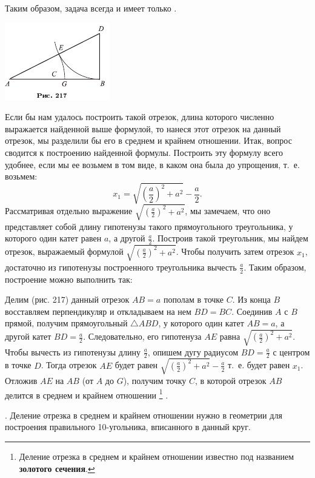 \documentclass[oneside]{book}
\begin{document}
Таким образом, задача всегда  и имеет только . %

\includegraphics{pics/ris-217}

Если бы нам удалось построить такой отрезок, длина которого численно выражается найденной выше формулой, то нанеся этот отрезок на данный отрезок, мы разделили бы его в среднем и крайнем отношении.
Итак, вопрос сводится к построению найденной формулы.
Построить эту формулу всего удобнее, если мы ее возьмем в том виде, в каком она была до упрощения, т.~е. возьмем:
\[x_1= \sqrt{\left(\frac a2\right)^2+a^2}-\frac a2.\]
Рассматривая отдельно выражение $\sqrt{\left(\frac a2\right)^2+a^2}$, мы замечаем, что оно представляет собой длину гипотенузы такого прямоугольного треугольника, у которого один катет равен $a$, а другой $\frac a2$.
Построив такой треугольник, мы найдем отрезок, выражаемый формулой $\sqrt{\left(\frac a2\right)^2+a^2}$.
Чтобы получить затем отрезок $x_1$, достаточно из гипотенузы построенного треугольника вычесть $\frac a2$.
Таким образом, построение можно выполнить так:

Делим (рис. 217) данный отрезок $AB=a$ пополам в точке $C$.
Из конца $B$ восставляем перпендикуляр и откладываем на нем $BD = BC$.
Соединив $A$ с $B$ прямой, получим прямоугольный $\triangle ABD$, у которого один катет $AB=a$, а другой катет $BD=\frac a2$.
Следовательно, его гипотенуза $AE$ равна $\sqrt{\left(\frac a2\right)^2+a^2}$.
Чтобы вычесть из гипотенузы длину $\frac a2$, опишем дугу радиусом $BD=\frac a2$ с центром в точке $D$.
Тогда отрезок $AE$ будет равен $\sqrt{\left(\frac a2\right)^2+a^2}-\frac a2$ т.~е. будет равен $x_1$.
Отложив $AE$ на $AB$ (от $A$ до $G$), получим точку $C$, в которой отрезок $AB$ делится в среднем и крайнем отношении%
\footnote{Деление отрезка в среднем и крайнем отношении известно под названием \textbf{золотого сечения}.}%
.

.
Деление отрезка в среднем и крайнем отношении нужно в геометрии для построения правильного 10-угольника, вписанного в данный круг.
\end{document}
